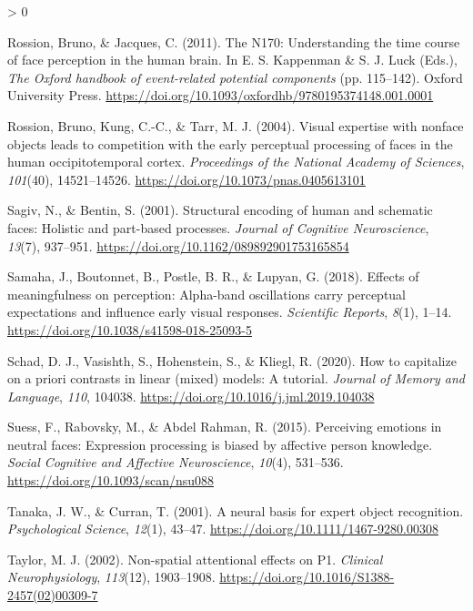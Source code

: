 \documentclass[
  english,
  man,12pt,twoside]{apa7}
\newlength{\cslhangindent}
\newenvironment{CSLReferences}[2] %
 {%
  \setlength{\parindent}{0pt}
  \ifodd #1 \everypar{\setlength{\hangindent}{\cslhangindent}}\ignorespaces\fi
  \ifnum #2 > 0
  \setlength{\parskip}{#2\baselineskip}
  \fi
 }%
 {}
\begin{document}
\begin{CSLReferences}{1}{0}
\leavevmode\hypertarget{ref-rossion2011}{}%
Rossion, Bruno, \& Jacques, C. (2011). The {N170}: Understanding the time course of face perception in the human brain. In E. S. Kappenman \& S. J. Luck (Eds.), \emph{The {Oxford} handbook of event-related potential components} (pp. 115--142). Oxford University Press. \url{https://doi.org/10.1093/oxfordhb/9780195374148.001.0001}

\leavevmode\hypertarget{ref-rossion2004}{}%
Rossion, Bruno, Kung, C.-C., \& Tarr, M. J. (2004). Visual expertise with nonface objects leads to competition with the early perceptual processing of faces in the human occipitotemporal cortex. \emph{Proceedings of the National Academy of Sciences}, \emph{101}(40), 14521--14526. \url{https://doi.org/10.1073/pnas.0405613101}

\leavevmode\hypertarget{ref-sagiv2001}{}%
Sagiv, N., \& Bentin, S. (2001). Structural encoding of human and schematic faces: Holistic and part-based processes. \emph{Journal of Cognitive Neuroscience}, \emph{13}(7), 937--951. \url{https://doi.org/10.1162/089892901753165854}

\leavevmode\hypertarget{ref-samaha2018}{}%
Samaha, J., Boutonnet, B., Postle, B. R., \& Lupyan, G. (2018). Effects of meaningfulness on perception: Alpha-band oscillations carry perceptual expectations and influence early visual responses. \emph{Scientific Reports}, \emph{8}(1), 1--14. \url{https://doi.org/10.1038/s41598-018-25093-5}

\leavevmode\hypertarget{ref-schad2020}{}%
Schad, D. J., Vasishth, S., Hohenstein, S., \& Kliegl, R. (2020). How to capitalize on a priori contrasts in linear (mixed) models: A tutorial. \emph{Journal of Memory and Language}, \emph{110}, 104038. \url{https://doi.org/10.1016/j.jml.2019.104038}

\leavevmode\hypertarget{ref-suess2015}{}%
Suess, F., Rabovsky, M., \& Abdel Rahman, R. (2015). Perceiving emotions in neutral faces: Expression processing is biased by affective person knowledge. \emph{Social Cognitive and Affective Neuroscience}, \emph{10}(4), 531--536. \url{https://doi.org/10.1093/scan/nsu088}

\leavevmode\hypertarget{ref-tanaka2001}{}%
Tanaka, J. W., \& Curran, T. (2001). A neural basis for expert object recognition. \emph{Psychological Science}, \emph{12}(1), 43--47. \url{https://doi.org/10.1111/1467-9280.00308}

\leavevmode\hypertarget{ref-taylor2002}{}%
Taylor, M. J. (2002). Non-spatial attentional effects on {P1}. \emph{Clinical Neurophysiology}, \emph{113}(12), 1903--1908. \url{https://doi.org/10.1016/S1388-2457(02)00309-7}


\end{CSLReferences}
\end{document}
